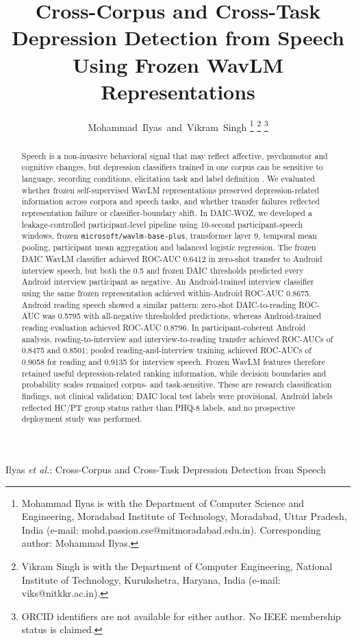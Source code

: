 \documentclass[lettersize,journal]{IEEEtran}
\begin{document}
\title{Cross-Corpus and Cross-Task Depression Detection from Speech Using Frozen WavLM Representations}

\author{Mohammad~Ilyas~and~Vikram~Singh%
\thanks{Mohammad Ilyas is with the Department of Computer Science and Engineering, Moradabad Institute of Technology, Moradabad, Uttar Pradesh, India (e-mail: mohd.passion.cse@mitmoradabad.edu.in). Corresponding author: Mohammad Ilyas.}%
\thanks{Vikram Singh is with the Department of Computer Engineering, National Institute of Technology, Kurukshetra, Haryana, India (e-mail: viks@nitkkr.ac.in).}%
\thanks{ORCID identifiers are not available for either author. No IEEE membership status is claimed.}}

%
{Ilyas \MakeLowercase{\textit{et al.}}: Cross-Corpus and Cross-Task Depression Detection from Speech}

\maketitle

\begin{abstract}
Speech is a non-invasive behavioral signal that may reflect affective, psychomotor and cognitive changes, but depression classifiers trained in one corpus can be sensitive to language, recording conditions, elicitation task and label definition \cite{leal2025survey,morenoTorres2012datasetShift,alghowinem2016crossCultural}. We evaluated whether frozen self-supervised WavLM representations preserved depression-related information across corpora and speech tasks, and whether transfer failures reflected representation failure or classifier-boundary shift. In DAIC-WOZ, we developed a leakage-controlled participant-level pipeline using 10-second participant-speech windows, frozen \texttt{microsoft/wavlm-base-plus}, transformer layer 9, temporal mean pooling, participant mean aggregation and balanced logistic regression. The frozen DAIC WavLM classifier achieved ROC-AUC 0.6412 in zero-shot transfer to Android interview speech, but both the 0.5 and frozen DAIC thresholds predicted every Android interview participant as negative. An Android-trained interview classifier using the same frozen representation achieved within-Android ROC-AUC 0.8675. Android reading speech showed a similar pattern: zero-shot DAIC-to-reading ROC-AUC was 0.5795 with all-negative thresholded predictions, whereas Android-trained reading evaluation achieved ROC-AUC 0.8796. In participant-coherent Android analysis, reading-to-interview and interview-to-reading transfer achieved ROC-AUCs of 0.8475 and 0.8501; pooled reading-and-interview training achieved ROC-AUCs of 0.9058 for reading and 0.9135 for interview speech. Frozen WavLM features therefore retained useful depression-related ranking information, while decision boundaries and probability scales remained corpus- and task-sensitive. These are research classification findings, not clinical validation; DAIC local test labels were provisional, Android labels reflected HC/PT group status rather than PHQ-8 labels, and no prospective deployment study was performed.
\end{abstract}
\end{document}
